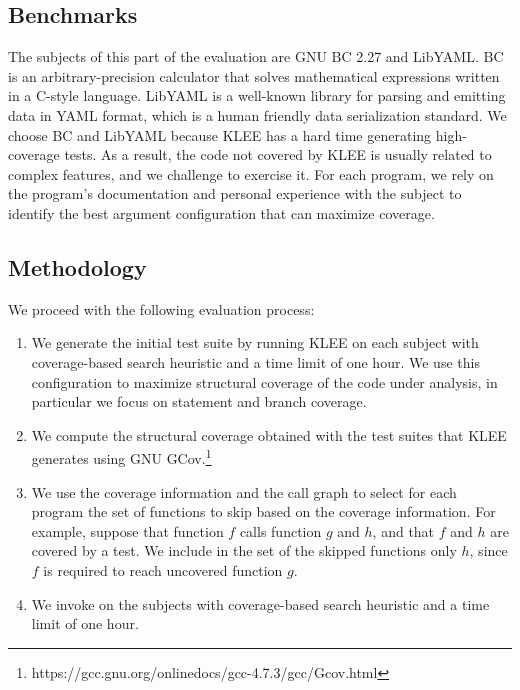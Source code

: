\subsection{Benchmarks} The subjects of this part of the evaluation are
GNU \textsf{BC} 2.27 and \textsf{LibYAML}. \textsf{BC} is an
arbitrary-precision calculator that solves mathematical expressions
written in a C-style language.  \textsf{LibYAML} is a well-known
library for parsing and emitting data in YAML format, which is a human
friendly data serialization standard.  We choose \textsf{BC} and
\textsf{LibYAML} because KLEE has a hard time generating high-coverage
tests. As a result, the code not covered by KLEE is usually related to
complex features, and we challenge \toolname to exercise it. For each
program, we rely on the program's documentation and personal
experience with the subject to identify the best argument
configuration that can maximize coverage.

\subsection{Methodology} We proceed with the following
evaluation process:

\begin{enumerate}[leftmargin=*]
\item We generate the initial test suite by running KLEE on each
  subject with coverage-based search heuristic and a time limit of one
  hour. We use this configuration to maximize structural coverage of
  the code under analysis, in particular we focus on statement and
  branch coverage.
\item We compute the structural coverage obtained with the test suites
  that KLEE generates using GNU
  GCov.\footnote{https://gcc.gnu.org/onlinedocs/gcc-4.7.3/gcc/Gcov.html}
\item We use the coverage information and the call graph to select for
  each program the set of functions to skip based on the coverage
  information. For example, suppose that function $f$ calls function
  $g$ and $h$, and that $f$ and $h$ are covered by a test. We include
  in the set of the skipped functions only $h$, since $f$ is required
  to reach uncovered function $g$.
\item We invoke \toolname on the subjects with coverage-based search
  heuristic and a time limit of one hour.
\end{enumerate}



